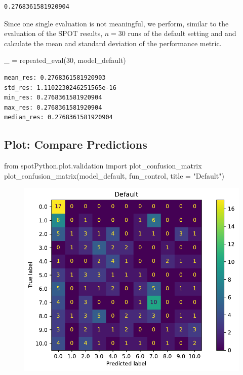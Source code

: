 \documentclass[
  letterpaper,
  DIV=11,
  numbers=noendperiod]{scrreprt}
\newenvironment{Shaded}{\begin{snugshade}}{\end{snugshade}}
\newcommand{\DecValTok}[1]{\textcolor[rgb]{0.68,0.00,0.00}{#1}}
\newcommand{\ImportTok}[1]{\textcolor[rgb]{0.00,0.46,0.62}{#1}}
\newcommand{\NormalTok}[1]{\textcolor[rgb]{0.00,0.23,0.31}{#1}}
\newcommand{\OperatorTok}[1]{\textcolor[rgb]{0.37,0.37,0.37}{#1}}
\newcommand{\StringTok}[1]{\textcolor[rgb]{0.13,0.47,0.30}{#1}}
\begin{document}
\begin{verbatim}
0.2768361581920904
\end{verbatim}

Since one single evaluation is not meaningful, we perform, similar to
the evaluation of the SPOT results, \(n=30\) runs of the default setting
and and calculate the mean and standard deviation of the performance
metric.

\begin{Shaded}
\begin{Highlighting}[]
\NormalTok{\_ }\OperatorTok{=}\NormalTok{ repeated\_eval(}\DecValTok{30}\NormalTok{, model\_default)}
\end{Highlighting}
\end{Shaded}

\begin{verbatim}
mean_res: 0.2768361581920903
std_res: 1.1102230246251565e-16
min_res: 0.2768361581920904
max_res: 0.2768361581920904
median_res: 0.2768361581920904
\end{verbatim}

\hypertarget{plot-compare-predictions-4}{%
\subsection{Plot: Compare
Predictions}\label{plot-compare-predictions-4}}

\begin{Shaded}
\begin{Highlighting}[]
\ImportTok{from}\NormalTok{ spotPython.plot.validation }\ImportTok{import}\NormalTok{ plot\_confusion\_matrix}
\NormalTok{plot\_confusion\_matrix(model\_default, fun\_control, title }\OperatorTok{=} \StringTok{"Default"}\NormalTok{)}
\end{Highlighting}
\end{Shaded}

\begin{figure}[H]

{\centering \includegraphics{19_spot_hpt_sklearn_multiclass_classification_knn_files/figure-pdf/cell-40-output-1.pdf}

}

\end{figure}
\end{document}
